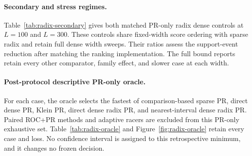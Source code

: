 \paragraph{Secondary and stress regimes.}
Table~\ref{tab:radix-secondary} gives both matched PR-only radix dense controls at $L=100$ and $L=300$.
These controls share fixed-width score ordering with sparse radix and retain full dense width sweeps.
Their ratios assess the support-event reduction after matching the ranking implementation.
The full bound reports retain every other comparator, family effect, and slower case at each width.

\begin{table}[tbp]
\centering\small
\setlength{\tabcolsep}{3pt}
\caption{Secondary and stress widths: all 308 cases per row, matched PR-only controls. Ratio direction and intervals follow Table~\ref{tab:radix-primary}.}
\label{tab:radix-secondary}
\end{table}

\paragraph{Post-protocol descriptive PR-only oracle.}
For each case, the oracle selects the fastest of comparison-based sparse PR, direct dense PR,
Klein PR, direct dense radix PR, and nearest-interval dense radix PR.
Paired ROC+PR methods and adaptive racers are excluded from this PR-only exhaustive set.
Table~\ref{tab:radix-oracle} and Figure~\ref{fig:radix-oracle} retain every case and loss.
No confidence interval is assigned to this retrospective minimum, and it changes no frozen decision.

